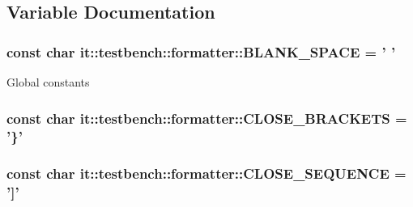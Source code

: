 \subsection{Variable Documentation}
\hypertarget{namespaceit_1_1testbench_1_1formatter_ae17ec1f53b5ddc40060d493f7d744664}{
\subsubsection[{B\-L\-A\-N\-K\-\_\-\-S\-P\-A\-C\-E}]{\setlength{\rightskip}{0pt plus 5cm}const char it\-::testbench\-::formatter\-::\-B\-L\-A\-N\-K\-\_\-\-S\-P\-A\-C\-E = ' '}}\label{dc/d8b/namespaceit_1_1testbench_1_1formatter_ae17ec1f53b5ddc40060d493f7d744664}
Global constants \hypertarget{namespaceit_1_1testbench_1_1formatter_a3c0d3e9ddb3ebc20b410ea614a1d6668}{
\subsubsection[{C\-L\-O\-S\-E\-\_\-\-B\-R\-A\-C\-K\-E\-T\-S}]{\setlength{\rightskip}{0pt plus 5cm}const char it\-::testbench\-::formatter\-::\-C\-L\-O\-S\-E\-\_\-\-B\-R\-A\-C\-K\-E\-T\-S = '\}'}}\label{dc/d8b/namespaceit_1_1testbench_1_1formatter_a3c0d3e9ddb3ebc20b410ea614a1d6668}
\hypertarget{namespaceit_1_1testbench_1_1formatter_af2292cfa9ef9d4b75f19f0249e2c15df}{
\subsubsection[{C\-L\-O\-S\-E\-\_\-\-S\-E\-Q\-U\-E\-N\-C\-E}]{\setlength{\rightskip}{0pt plus 5cm}const char it\-::testbench\-::formatter\-::\-C\-L\-O\-S\-E\-\_\-\-S\-E\-Q\-U\-E\-N\-C\-E = '\mbox{]}'}}\label{dc/d8b/namespaceit_1_1testbench_1_1formatter_af2292cfa9ef9d4b75f19f0249e2c15df}
